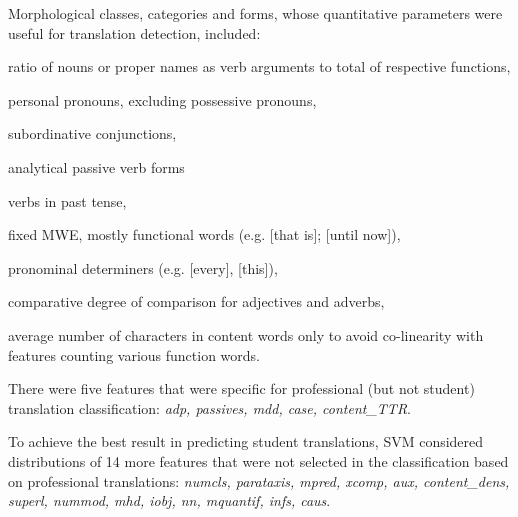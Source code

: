 Morphological classes, categories and forms, whose quantitative parameters were useful for translation detection, included: 
\begin{description}\compresslist{}
	\item[nnargs:] ratio of nouns or proper names as verb arguments to total of respective functions,
	\item[ppron:] personal pronouns, excluding possessive pronouns,
	\item[sconj:] subordinative conjunctions,
	\item[aux:pass:] analytical passive verb forms
	\item[pasttense:] verbs in past tense,
	\item[fixed:] fixed \gls{MWE}, mostly functional words (e.g.  [that is];  [until now]),
	\item[determ:] pronominal determiners (e.g.  [every],  [this]),
	\item[compar:] comparative degree of comparison for adjectives and adverbs,
	\item[wdlength:] average number of characters in content words only to avoid co-linearity with features counting various function words.
\end{description}

There were five features that were specific for professional (but not student) translation classification: \textit{adp, passives, mdd, case, content\_TTR}. 

To achieve the best result in predicting student translations, SVM considered distributions of 14 more features that were not selected in the classification based on professional translations: \textit{numcls, parataxis, mpred, xcomp, aux, content\_dens, superl, nummod, mhd, iobj, nn, mquantif, infs, caus}. 

